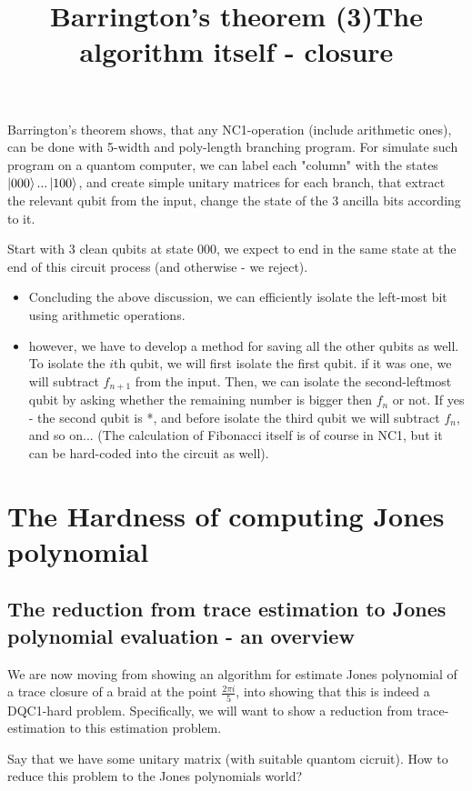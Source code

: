 \documentclass{article}
\begin{document}
\title{Barrington's theorem (3)}
Barrington's theorem shows, that any NC1-operation (include arithmetic ones), can be done with 5-width and poly-length branching program. For simulate such program on a quantom computer, we can label each "column" with the states $\left\vert{000}\right\rangle...\left\vert{100}\right\rangle$, and create simple unitary matrices for each branch, that extract the relevant qubit from the input, change the state of the 3 ancilla bits according to it. 

Start with 3 clean qubits at state 000, we expect to end in the same state at the end of this circuit process (and otherwise - we reject).


\title{The algorithm itself - closure}
\begin{itemize}
\item Concluding the above discussion, we can efficiently isolate the left-most bit using arithmetic operations.
\item however, we have to develop a method for saving all the other qubits as well. To isolate the $i$th qubit, we will first isolate the first qubit. if it was one, we will subtract $f_{n+1}$ from the input. Then, we can isolate the second-leftmost qubit by asking whether the remaining number is bigger then $f_{n}$ or not. If yes - the second qubit is *, and before isolate the third qubit we will subtract $f_{n}$, and so on... (The calculation of Fibonacci itself is of course in NC1, but it can be hard-coded into the circuit as well).
\end{itemize}






\section{The Hardness of computing Jones polynomial}
\subsection{The reduction from trace estimation to Jones polynomial evaluation - an overview}

We are now moving from showing an algorithm for estimate Jones polynomial of a trace closure of a braid at the point $\frac{2{\pi}i}{5}$, into showing that this is indeed a DQC1-hard problem. Specifically, we will want to show a reduction from trace-estimation to this estimation problem.

Say that we have some unitary matrix (with suitable quantom cicruit). How to reduce this problem to the Jones polynomials world?
\end{document}
